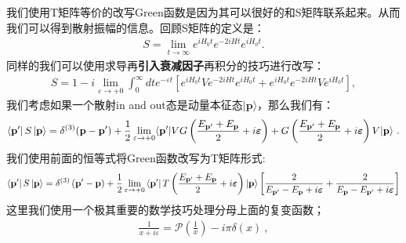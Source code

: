 \bigskip
{}

我们使用T矩阵等价的改写Green函数是因为其可以很好的和S矩阵联系起来。从而我们可以得到散射振幅的信息。回顾S矩阵的定义是：
\begin{align}
  S=\lim_{t\to\infty}e^{iH_0t}e^{-2iHt}e^{iH_0t}.
\end{align}
同样的我们可以使用求导再\textbf{引入衰减因子}再积分的技巧进行改写：
\begin{align}
  S=1-i\lim_{\varepsilon\to+0}\int_0^\infty dte^{-\varepsilon
  t}\left[e^{iH_0t}Ve^{-2iHt}e^{iH_0t}+e^{iH_0t}e^{-2iHt}Ve^{iH_0t}\right],
\end{align}
我们考虑如果一个散射in and out态是动量本征态$ |\mathbf{p}\rangle $，那么我们有：
\begin{align}
  \bra{\mathbf{p'}}S
  \ket{\mathbf{p}}=\delta^{(3)}(\mathbf{p}-\mathbf{p}^{\prime})+
  \frac{1}{2}\lim_{\varepsilon\to+0}\langle\mathbf{p}^{\prime}|VG\left(\frac{E_{\mathbf{p}^{\prime}}+E_{\mathbf{p}}}{2}+i\boldsymbol{\varepsilon}\right)+G\left(\frac{E_{\mathbf{p}^{\prime}}+E_{\mathbf{p}}}{2}+i\boldsymbol{\varepsilon}\right)V|\mathbf{p}\rangle\mathrm{~.}
\end{align}
我们使用前面的恒等式将Green函数改写为T矩阵形式:
\begin{align}
  \bra{\mathbf{p'}}S
  \ket{\mathbf{p}}=\delta^{(3)}\left(\mathbf{p}^{\prime}-\mathbf{p}\right)+\frac{1}{2}\lim_{\varepsilon
  \to+0}\left\langle\mathbf{p}^{\prime}\right|T\left(\frac{E_{\mathbf{p}^{\prime}}+E_{\mathbf{p}}}{2}+i\boldsymbol{\varepsilon}\right)|\mathbf{p}\rangle\left[\frac{2}{E_{\mathbf{p}^{\prime}}-E_{\mathbf{p}}+i\boldsymbol{\varepsilon}}+\frac{2}{E_{\mathbf{p}}-E_{\mathbf{p}^{\prime}}+i\boldsymbol{\varepsilon}}\right]
\end{align}
这里我们使用一个极其重要的数学技巧处理分母上面的复变函数；
\begin{align}
  \frac{1}{x+i\varepsilon}=\mathscr{P}\left(\frac{1}{x}\right)-i\pi\delta(x)\mathrm{~,}
\end{align}

